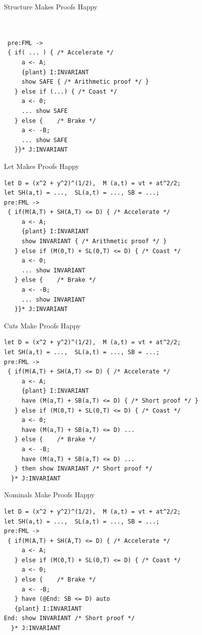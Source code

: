 \documentclass[slidestop,aspectratio=169]{beamer}
\theoremstyle{plain}
\theoremstyle{definition}
\theoremstyle{remark}
\begin{document}
\begin{frame}[t,fragile]{Structure Makes Proofs Happy}
\begin{verbatim}


 pre:FML ->
 { if( ... ) { /* Accelerate */
     a <- A;
     {plant} I:INVARIANT
     show SAFE { /* Arithmetic proof */ }
   } else if (...) { /* Coast */
     a <- 0;
     ... show SAFE
   } else {    /* Brake */
     a <- -B;
     ... show SAFE
   }}* J:INVARIANT
\end{verbatim}
\end{frame}

\begin{frame}[t,fragile]{Let Makes Proofs Happy}
\begin{verbatim}
let D = (x^2 + y^2)^(1/2),  M (a,t) = vt + at^2/2;
let SH(a,t) = ...,  SL(a,t) = ..., SB = ...;
pre:FML ->
 { if(M(A,T) + SH(A,T) <= D) { /* Accelerate */
     a <- A;
     {plant} I:INVARIANT
     show INVARIANT { /* Arithmetic proof */ }
   } else if (M(0,T) + SL(0,T) <= D) { /* Coast */
     a <- 0;
     ... show INVARIANT
   } else {    /* Brake */
     a <- -B;
     ... show INVARIANT
   }}* J:INVARIANT

\end{verbatim}
\end{frame}

\begin{frame}[t,fragile]{Cuts Make Proofs Happy}
\begin{verbatim}
let D = (x^2 + y^2)^(1/2),  M (a,t) = vt + at^2/2;
let SH(a,t) = ...,  SL(a,t) = ..., SB = ...;
pre:FML ->
 { if(M(A,T) + SH(A,T) <= D) { /* Accelerate */
     a <- A;
     {plant} I:INVARIANT
     have (M(a,T) + SB(a,T) <= D) { /* Short proof */ }
   } else if (M(0,T) + SL(0,T) <= D) { /* Coast */
     a <- 0;
     have (M(a,T) + SB(a,T) <= D) ...
   } else {    /* Brake */
     a <- -B;
     have (M(a,T) + SB(a,T) <= D) ...
   } then show INVARIANT /* Short proof */
  }* J:INVARIANT

\end{verbatim}
\end{frame}

\begin{frame}[t,fragile]{Nominals Make Proofs Happy}
\begin{verbatim}
let D = (x^2 + y^2)^(1/2),  M (a,t) = vt + at^2/2;
let SH(a,t) = ...,  SL(a,t) = ..., SB = ...;
pre:FML ->
 { if(M(A,T) + SH(A,T) <= D) { /* Accelerate */
     a <- A;
   } else if (M(0,T) + SL(0,T) <= D) { /* Coast */
     a <- 0;
   } else {    /* Brake */
     a <- -B;
   } have (@End: SB <= D) auto
   {plant} I:INVARIANT
End: show INVARIANT /* Short proof */
  }* J:INVARIANT


\end{verbatim}
\end{frame}
\end{document}
